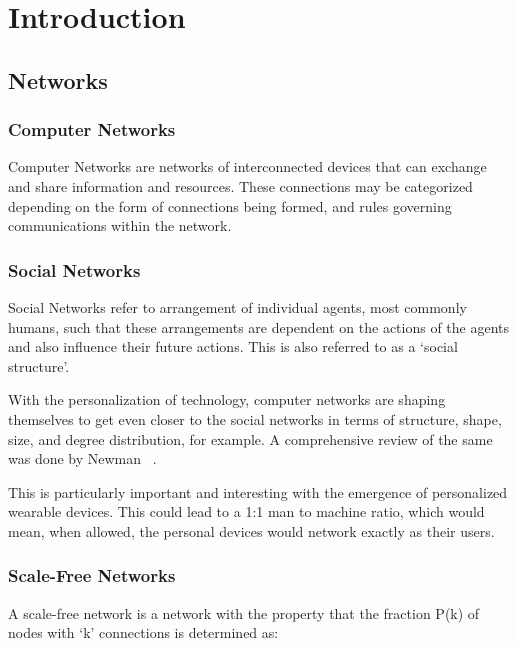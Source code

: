 
\chapter{Introduction} %

\label{Chapter1} %



\section{Networks}

\subsection{Computer Networks}
Computer Networks are networks of interconnected devices that can exchange and share information and resources. These connections may be categorized depending on the form of connections being formed, and rules governing communications within the network.

\subsection{Social Networks}
Social Networks refer to arrangement of individual agents, most commonly humans, such that these arrangements are dependent on the actions of the agents and also influence their future actions. This is also referred to as a `social structure'. 

With the personalization of technology, computer networks are shaping themselves to get even closer to the social networks in terms of structure, shape, size, and degree distribution, for example. A comprehensive review of the same was done by Newman~\cite{Newman03thestructure} . 

This is particularly important and interesting with the emergence of personalized wearable devices. This could lead to a 1:1 man to machine ratio, which would mean, when allowed, the personal devices would network exactly as their users.

\subsection{Scale-Free Networks}
A scale-free network is a network with the property that the fraction P(k) of nodes with `k' connections  is determined as: 

